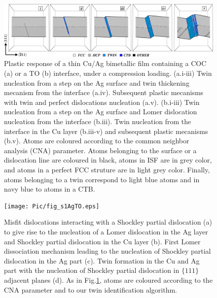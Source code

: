 \documentclass[final,3p,times,twocolumn]{elsarticle}
\begin{document}
\begin{figure}[!t]
	\begin{center}
		\includegraphics[width=150mm]{Pic/fig_s1AgCOC.eps} 
	\end{center}
	\caption{Plastic response of a thin Cu/Ag bimetallic film containing a COC (a) or a TO (b) interface, under a compression loading. 
(a.i-iii) Twin nucleation from a step on the Ag surface and twin thickening mecanism from the interface (a.iv). Subsequent plastic mecanisms with twin and perfect dislocations nucleation (a.v). (b.i-iii) Twin nucleation from a step on the Ag surface and Lomer dislocation nucleation from the interface (b.iii). Twin nucleation from the interface in the Cu layer (b.iii-v) and subsequent plastic mecanisms (b.v).
Atoms are coloured according to the common neighbor analysis (CNA) parameter. Atoms belonging to the surface or a dislocation line are coloured in black, atoms in ISF are in grey color, and atoms in a perfect FCC struture are in light grey color. Finally, atoms belonging to a twin correspond to light blue atoms and in navy blue to atoms in a CTB.}\label{fig_s1AgCOC}
\end{figure}

\begin{figure}[!t]
	\begin{center}
		\texttt{[image: Pic/fig\_s1AgTO.eps]} 
	\end{center}\caption{Misfit dislocations interacting with a Shockley partial dislocation (a) to give rise to the nucleation of a Lomer dislocation in the Ag layer and Shockley partial dislocation in the Cu layer (b). First Lomer dissociation mechanism leading to the nucleation of Shockley partial dislocation in the Ag part (c). Twin formation in the Cu and Ag part with the nucleation of Shockley partial dislocation in $\lbrace111\rbrace$ adjacent planes (d). As in Fig.\ref{fig_s1AgCOC}, atoms are coloured according to the CNA parameter and to our twin identification algorithm.}\label{fig_react_TO}
\end{figure}
\end{document}
